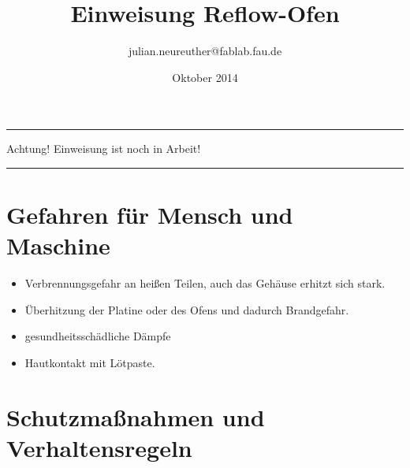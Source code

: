 \documentclass{\basedir/fablab-document}
\date{Oktober 2014}
\author{julian.neureuther@fablab.fau.de}
\title{Einweisung Reflow-Ofen}
\begin{document}
\dosecttoc
\faketableofcontents
{}

\color{red}
\hrule
\begin{center}
\large{Achtung! Einweisung ist noch in Arbeit!}
\vspace{0.1cm}
\end{center}
\hrule
\color{black}

\section{Gefahren für Mensch und Maschine}

\begin{itemize}
	\item Verbrennungsgefahr an heißen Teilen, auch das Gehäuse erhitzt sich stark.
	\item Überhitzung der Platine oder des Ofens und dadurch Brandgefahr.
	\item gesundheitsschädliche Dämpfe
	\item Hautkontakt mit Lötpaste.
\end{itemize}

\section{Schutzmaßnahmen und Verhaltensregeln}
\end{document}
